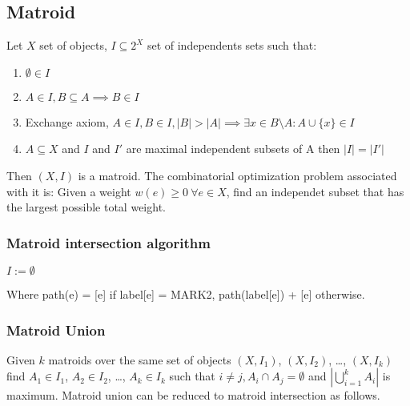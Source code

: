 \documentclass[a4paper,10pt,oneside]{article}
\begin{document}
\begin{multicols}{2}
\subsection{Matroid}
Let $X$ set of objects, $I \subseteq 2^X$ set of independents sets such that:
\begin{enumerate}
\item $\emptyset \in I$
\item $A \in I, B \subseteq A \implies B \in I$
\item Exchange axiom, $A \in I, B \in I, |B| > |A| \implies \exists x \in B \setminus A : A \cup \{x\} \in I$
\item $A \subseteq X$ and $I$ and $I'$ are maximal independent subsets of A then $|I| = |I'|$
\end{enumerate}
Then $(X, I)$ is a matroid. The combinatorial optimization problem associated with it is: Given a weight $w(e) \geq 0 ~\forall e \in X$, find an independet subset that has the largest possible total weight.

\subsubsection{Matroid intersection algorithm}
\begin{algorithm}[H]
\SetAlgoLined
{}
$I := \emptyset$\;
\end{algorithm}

Where path(e) = [e] if label[e] = MARK2, path(label[e]) + [e] otherwise.

\subsubsection{Matroid Union}
Given $k$ matroids over the same set of objects $(X, I_1)$, $(X, I_2)$, \dots, $(X, I_k)$ find $A_1 \in I_1$, $A_2 \in I_2$, \dots, $A_k \in I_k$ such that $i \not= j, A_i \cap A_j = \emptyset$ and $|\bigcup\limits_{i=1}^{k} A_i|$ is maximum. Matroid union can be reduced to matroid intersection as follows.


\end{multicols}
\end{document}

